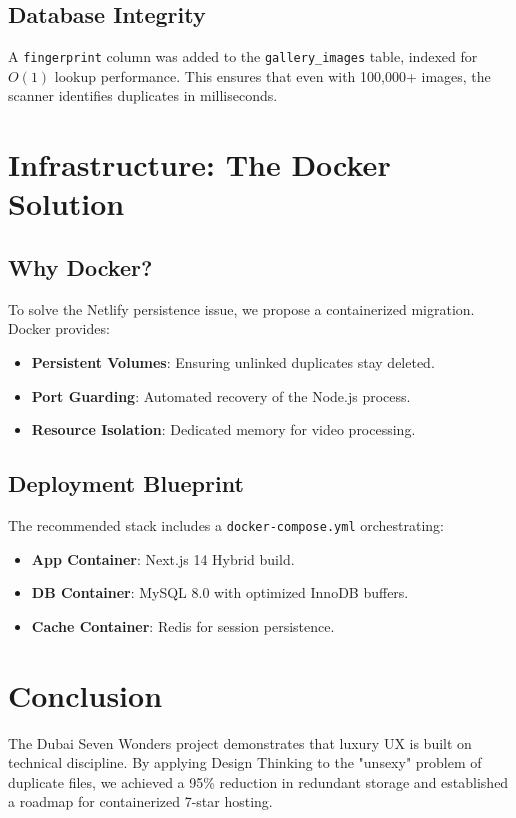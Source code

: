 \documentclass[12pt,a4paper]{report}
\begin{document}
\section{Database Integrity}
A \texttt{fingerprint} column was added to the \texttt{gallery_images} table, indexed for $O(1)$ lookup performance. This ensures that even with 100,000+ images, the scanner identifies duplicates in milliseconds.

\chapter{Infrastructure: The Docker Solution}
\section{Why Docker?}
To solve the Netlify persistence issue, we propose a containerized migration. Docker provides:
\begin{itemize}
    \item \textbf{Persistent Volumes}: Ensuring unlinked duplicates stay deleted.
    \item \textbf{Port Guarding}: Automated recovery of the Node.js process.
    \item \textbf{Resource Isolation}: Dedicated memory for video processing.
\end{itemize}

\section{Deployment Blueprint}
The recommended stack includes a \texttt{docker-compose.yml} orchestrating:
\begin{itemize}
    \item \textbf{App Container}: Next.js 14 Hybrid build.
    \item \textbf{DB Container}: MySQL 8.0 with optimized InnoDB buffers.
    \item \textbf{Cache Container}: Redis for session persistence.
\end{itemize}

\chapter{Conclusion}
The Dubai Seven Wonders project demonstrates that luxury UX is built on technical discipline. By applying Design Thinking to the "unsexy" problem of duplicate files, we achieved a 95\% reduction in redundant storage and established a roadmap for containerized 7-star hosting.
\end{document}
